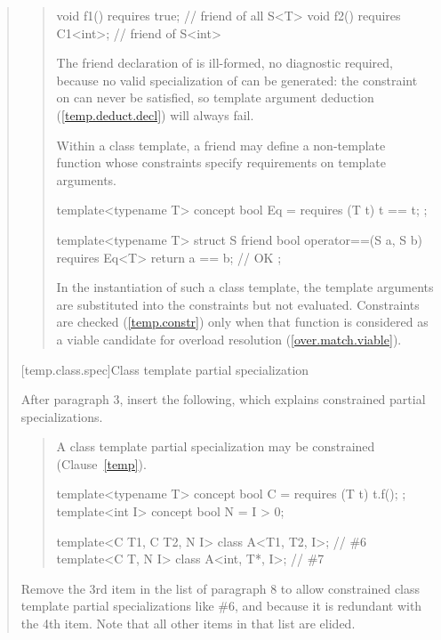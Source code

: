 \begin{quote}
\begin{quote}
\begin{addedblock}
\begin{codeblock}
void f1() requires true;    // friend of all S<T>
void f2() requires C1<int>; // friend of S<int>
\end{codeblock}
The friend declaration of  is ill-formed, no
diagnostic required, because no valid specialization of 
can be generated: the constraint on  can never
be satisfied, so template argument deduction
(\ref{temp.deduct.decl}) will always fail.
\exitexample

\pnum
\enternote
Within a class template, a friend may define a non-template function
whose constraints specify requirements on template arguments.
\enterexample
\begin{codeblock}
template<typename T> concept bool Eq = requires (T t) { t == t; };

template<typename T>
  struct S {
    friend bool operator==(S a, S b) requires Eq<T> { return a == b; } // OK
  };
\end{codeblock}
\exitexample
In the instantiation of such a class template, the template
arguments are substituted into the constraints but not evaluated.
Constraints are checked (\ref{temp.constr}) only when
that function is considered as a viable candidate for overload resolution
(\ref{over.match.viable}).
\exitnote
\end{addedblock}
\end{quote}


[temp.class.spec]{Class template partial specialization}

After paragraph 3, insert the following, which explains constrained partial 
specializations.

\begin{quote}
\begin{addedblock}
\setcounter{Paras}{3}
\pnum
A class template partial specialization may be constrained
(Clause~\ref{temp}).
\enterexample
\begin{codeblock}
template<typename T> concept bool C = requires (T t) { t.f(); };
template<int I> concept bool N = I > 0;

template<C T1, C T2, N I> class A<T1, T2, I>;  // \#6
template<C T, N I>        class A<int, T*, I>; // \#7
\end{codeblock}
\exitexample
\end{addedblock}
\end{quote}

Remove the 3rd item in the list of paragraph 8 to allow constrained class 
template partial specializations like \#6, and because it is redundant with 
the 4th item. Note that all other items in that list are elided.


\end{quote}
